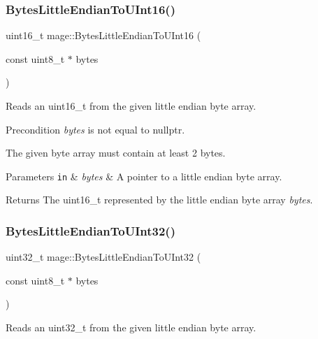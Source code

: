 \subsubsection{\texorpdfstring{Bytes\+Little\+Endian\+To\+U\+Int16()}{BytesLittleEndianToUInt16()}}
{\footnotesize\ttfamily uint16\+\_\+t mage\+::\+Bytes\+Little\+Endian\+To\+U\+Int16 (\begin{DoxyParamCaption}\item[{const uint8\+\_\+t $\ast$}]{bytes }\end{DoxyParamCaption})\hspace{0.3cm}{\ttfamily [noexcept]}}

Reads an uint16\+\_\+t from the given little endian byte array.

\begin{DoxyPrecond}{Precondition}
{\itshape bytes} is not equal to {\ttfamily nullptr}. 

The given byte array must contain at least 2 bytes. 
\end{DoxyPrecond}

\begin{DoxyParams}[1]{Parameters}
\mbox{\tt in}  & {\em bytes} & A pointer to a little endian byte array. \\
\hline
\end{DoxyParams}
\begin{DoxyReturn}{Returns}
The {\ttfamily uint16\+\_\+t} represented by the little endian byte array {\itshape bytes}. 
\end{DoxyReturn}
\hypertarget{namespacemage_a5e26714f4f748035770b67c53af755a6}{}\label{namespacemage_a5e26714f4f748035770b67c53af755a6} 
\subsubsection{\texorpdfstring{Bytes\+Little\+Endian\+To\+U\+Int32()}{BytesLittleEndianToUInt32()}}
{\footnotesize\ttfamily uint32\+\_\+t mage\+::\+Bytes\+Little\+Endian\+To\+U\+Int32 (\begin{DoxyParamCaption}\item[{const uint8\+\_\+t $\ast$}]{bytes }\end{DoxyParamCaption})\hspace{0.3cm}{\ttfamily [noexcept]}}

Reads an uint32\+\_\+t from the given little endian byte array.

